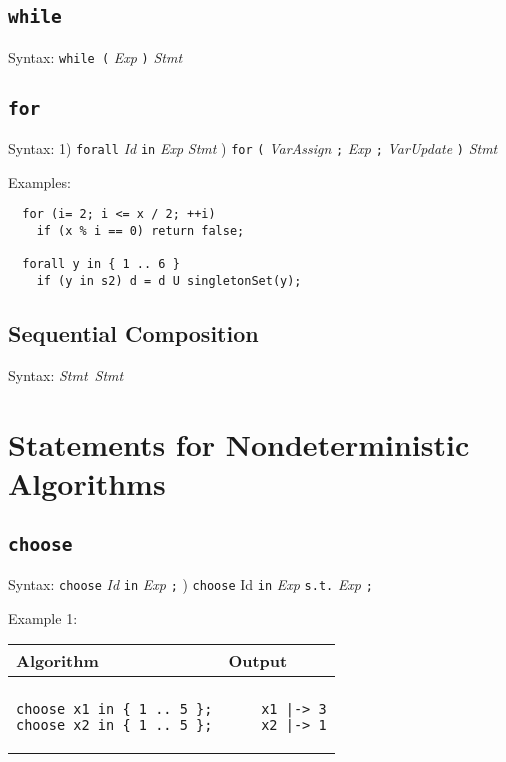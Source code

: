 \documentclass[a4paper]{report}
\begin{document}
\subsection{\texttt{while}}

Syntax: \verb'while (' {\it Exp} \verb')' {\it Stmt}


\subsection{\texttt{for}}

Syntax: 1) \verb"forall" {\it Id} \verb"in" {\it Exp}  {\it Stmt} ) \verb"for" \verb"(" {\it VarAssign} \verb";" {\it Exp} \verb";" {\it VarUpdate} \verb")" {\it Stmt}

Examples:
\begin{verbatim}
  for (i= 2; i <= x / 2; ++i)
    if (x % i == 0) return false;

  forall y in { 1 .. 6 }
    if (y in s2) d = d U singletonSet(y);
\end{verbatim}



\subsection{Sequential Composition}

Syntax: {\it Stmt}~{\it Stmt}

\section{Statements for Nondeterministic Algorithms}

\subsection{\texttt{choose}}

Syntax:  \verb"choose" {\it Id} \verb"in" {\it Exp} \verb";"  ) \verb"choose" Id \verb"in" {\it Exp} \verb"s.t." {\it Exp} \verb";"

Example 1:
\begin{center}
\begin{tabular}{ll}
Algorithm & Output\\
\hline
\\
\begin{minipage}{.45\textwidth}
\begin{verbatim}
choose x1 in { 1 .. 5 };
choose x2 in { 1 .. 5 };
\end{verbatim}
\end{minipage}
&
\begin{minipage}{.45\textwidth}
\begin{verbatim}
    x1 |-> 3
    x2 |-> 1
\end{verbatim}
\end{minipage}
\end{tabular}
\end{center}
\end{document}

